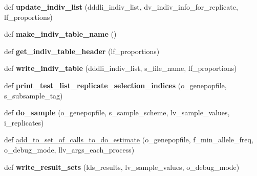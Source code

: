 \begin{DoxyCompactItemize}
\item 
def {\bfseries update\+\_\+indiv\+\_\+list} (dddli\+\_\+indiv\+\_\+list, dv\+\_\+indiv\+\_\+info\+\_\+for\+\_\+replicate, lf\+\_\+proportions)\hypertarget{namespacenegui_1_1pgdriveneestimator_a13125786920acfc0de2b28feadb33d52}{}\label{namespacenegui_1_1pgdriveneestimator_a13125786920acfc0de2b28feadb33d52}

\item 
def {\bfseries make\+\_\+indiv\+\_\+table\+\_\+name} ()\hypertarget{namespacenegui_1_1pgdriveneestimator_aba42585f01bf9ed8468c043e7f05e56a}{}\label{namespacenegui_1_1pgdriveneestimator_aba42585f01bf9ed8468c043e7f05e56a}

\item 
def {\bfseries get\+\_\+indiv\+\_\+table\+\_\+header} (lf\+\_\+proportions)\hypertarget{namespacenegui_1_1pgdriveneestimator_a8ea31f316844b96fb9ba5d9985b16ecc}{}\label{namespacenegui_1_1pgdriveneestimator_a8ea31f316844b96fb9ba5d9985b16ecc}

\item 
def {\bfseries write\+\_\+indiv\+\_\+table} (dddli\+\_\+indiv\+\_\+list, s\+\_\+file\+\_\+name, lf\+\_\+proportions)\hypertarget{namespacenegui_1_1pgdriveneestimator_aafa226c9f86340bb646ac850410d315c}{}\label{namespacenegui_1_1pgdriveneestimator_aafa226c9f86340bb646ac850410d315c}

\item 
def {\bfseries print\+\_\+test\+\_\+list\+\_\+replicate\+\_\+selection\+\_\+indices} (o\+\_\+genepopfile, s\+\_\+subsample\+\_\+tag)\hypertarget{namespacenegui_1_1pgdriveneestimator_af36962b92212576d2da7a47aa3c5db04}{}\label{namespacenegui_1_1pgdriveneestimator_af36962b92212576d2da7a47aa3c5db04}

\item 
def {\bfseries do\+\_\+sample} (o\+\_\+genepopfile, s\+\_\+sample\+\_\+scheme, lv\+\_\+sample\+\_\+values, i\+\_\+replicates)\hypertarget{namespacenegui_1_1pgdriveneestimator_aa5f7fc02442df628112ba81a98a3691e}{}\label{namespacenegui_1_1pgdriveneestimator_aa5f7fc02442df628112ba81a98a3691e}

\item 
def \hyperlink{namespacenegui_1_1pgdriveneestimator_ad1018c6053d4566bdf06702b7e79d1dc}{add\+\_\+to\+\_\+set\+\_\+of\+\_\+calls\+\_\+to\+\_\+do\+\_\+estimate} (o\+\_\+genepopfile, f\+\_\+min\+\_\+allele\+\_\+freq, o\+\_\+debug\+\_\+mode, llv\+\_\+args\+\_\+each\+\_\+process)
\item 
def {\bfseries write\+\_\+result\+\_\+sets} (lds\+\_\+results, lv\+\_\+sample\+\_\+values, o\+\_\+debug\+\_\+mode)\hypertarget{namespacenegui_1_1pgdriveneestimator_a0c5008a88def44e22c85b3e66f81cfc5}{}\label{namespacenegui_1_1pgdriveneestimator_a0c5008a88def44e22c85b3e66f81cfc5}


\end{DoxyCompactItemize}
